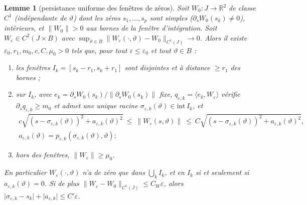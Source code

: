 \documentclass[11pt,a4paper]{article}
\newtheorem{lemme}[theoreme]{Lemme}
\theoremstyle{remark}
\newcommand{\R}{\mathbb R}
\newcommand{\vth}{\vartheta}
\begin{document}
\begin{lemme}[persistance uniforme des fenêtres de zéros]\label{lem:U2}
Soit $W_0:J\to\R^2$ de classe $C^1$ (indépendante de $\vth$) dont les zéros $s_1,\dots,s_p$ sont simples ($\partial_sW_0(s_k)\ne0$), intérieurs, et $\lVert W_0\rVert>0$ aux bornes de la fenêtre d'intégration. Soit $W_\varepsilon\in C^2(J\times B)$ avec $\sup_{\vth\in B}\lVert W_\varepsilon(\cdot,\vth)-W_0\rVert_{C^1(J)}\to0$. Alors il existe $\varepsilon_0,r_1,m_0,c,C,\mu_0>0$ tels que, pour tout $\varepsilon\le\varepsilon_0$ et tout $\vth\in B$ :
\begin{enumerate}[nosep,label=(\roman*)]
\item les fenêtres $I_k=[s_k-r_1,s_k+r_1]$ sont disjointes et à distance $\ge r_1$ des bornes ;
\item sur $I_k$, avec $e_k=\partial_sW_0(s_k)/\lVert\partial_sW_0(s_k)\rVert$ \emph{fixe}, $q_{\varepsilon,k}=\langle e_k,W_\varepsilon\rangle$ vérifie $\partial_sq_{\varepsilon,k}\ge m_0$ et admet une unique racine $\sigma_{\varepsilon,k}(\vth)\in\mathrm{int}\,I_k$, et
\[
\begin{gathered}
c\sqrt{(s-\sigma_{\varepsilon,k}(\vth))^2+a_{\varepsilon,k}(\vth)^2}\ \le\ \lVert W_\varepsilon(s,\vth)\rVert\ \le\ C\sqrt{(s-\sigma_{\varepsilon,k}(\vth))^2+a_{\varepsilon,k}(\vth)^2},\\
a_{\varepsilon,k}(\vth)=p_{\varepsilon,k}(\sigma_{\varepsilon,k}(\vth),\vth) ;
\end{gathered}
\]
\item hors des fenêtres, $\lVert W_\varepsilon\rVert\ge\mu_0$.
\end{enumerate}
En particulier $W_\varepsilon(\cdot,\vth)$ n'a de zéro que dans $\bigcup_kI_k$, et en $I_k$ si et seulement si $a_{\varepsilon,k}(\vth)=0$. Si de plus $\lVert W_\varepsilon-W_0\rVert_{C^1(J)}\le C_W\varepsilon$, alors $\lvert\sigma_{\varepsilon,k}-s_k\rvert+\lvert a_{\varepsilon,k}\rvert\le C'\varepsilon$.
\end{lemme}
\end{document}
